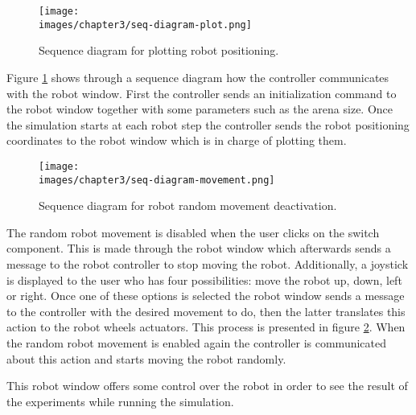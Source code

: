 \begin{figure}[h!]
  \centering
  \texttt{[image: \\images/chapter3/seq-diagram-plot.png]}
  \caption{Sequence diagram for plotting robot positioning.}
  \label{fig:ch-3:seq-diagram-plot.png}
\end{figure}

Figure \ref{fig:ch-3:seq-diagram-plot.png} shows through a sequence diagram how the controller communicates with the robot window. First the controller sends an initialization command to the robot window together with some parameters such as the arena size. Once the simulation starts at each robot step the controller sends the robot positioning coordinates to the robot window which is in charge of plotting them. 

\begin{figure}[h!]
  \centering
  \texttt{[image: \\images/chapter3/seq-diagram-movement.png]}
  \caption{Sequence diagram for robot random movement deactivation.}
  \label{fig:ch-3:seq-diagram-movement}
\end{figure}

The random robot movement is disabled when the user clicks on the switch component. This is made through the robot window which afterwards sends a message to the robot controller to stop moving the robot. Additionally, a joystick is displayed to the user who has four possibilities: move the robot up, down, left or right. Once one of these options is selected the robot window sends a message to the controller with the desired movement to do, then the latter translates this action to the robot wheels actuators. This process is presented in figure \ref{fig:ch-3:seq-diagram-movement}. When the random robot movement is enabled again the controller is communicated about this action and starts moving the robot randomly.

This robot window offers some control over the robot in order to see the result of the experiments while running the simulation.

